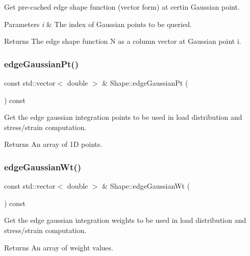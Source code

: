 Get pre-\/cached edge shape function (vector form) at certin Gaussian point. 


\begin{DoxyParams}{Parameters}
{\em i} & The index of Gaussian points to be queried. \\
\hline
\end{DoxyParams}
\begin{DoxyReturn}{Returns}
The edge shape function N as a column vector at Gaussian point i. 
\end{DoxyReturn}
\mbox{\label{class_shape_af004504284fc26fee888906a13a6fab2}} 
\subsubsection{\texorpdfstring{edge\+Gaussian\+Pt()}{edgeGaussianPt()}}
{\footnotesize\ttfamily const std\+::vector$<$ double $>$ \& Shape\+::edge\+Gaussian\+Pt (\begin{DoxyParamCaption}{ }\end{DoxyParamCaption}) const}



Get the edge gaussian integration points to be used in load distribution and stress/strain computation. 

\begin{DoxyReturn}{Returns}
An array of 1D points. 
\end{DoxyReturn}
\mbox{\label{class_shape_a651a829c004900fe28c9bdadf0939306}} 
\subsubsection{\texorpdfstring{edge\+Gaussian\+Wt()}{edgeGaussianWt()}}
{\footnotesize\ttfamily const std\+::vector$<$ double $>$ \& Shape\+::edge\+Gaussian\+Wt (\begin{DoxyParamCaption}{ }\end{DoxyParamCaption}) const}



Get the edge gaussian integration weights to be used in load distribution and stress/strain computation. 

\begin{DoxyReturn}{Returns}
An array of weight values. 
\end{DoxyReturn}
\mbox{\label{class_shape_a29de5d31e0fa74a4d1067f6d14cd94ed}} 
